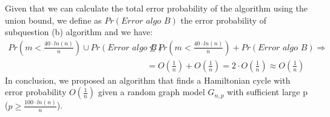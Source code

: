 \documentclass[11pt]{537homework}
\begin{document}
Given that we can calculate the total error probability of the algorithm using the union bound, we define as $Pr(\textit{Error algo B})$ the error probability of subquestion (b) algorithm and we have:
\begin{align*}
Pr(m  < \frac{40 \cdot ln(n)}{n}) \cup Pr(\textit{Error algo B})  &\leq  Pr(m  < \frac{40 \cdot ln(n)}{n}) + Pr(\textit{Error algo B}) \Longrightarrow \\ 
&= O(\frac{1}{n}) + O(\frac{1}{n}) = 2 \cdot O(\frac{1}{n}) \approx O(\frac{1}{n})
\end{align*}
In conclusion, we proposed an algorithm that finds a Hamiltonian cycle with error probability $O(\frac{1}{n})$ given a random graph model $G_{n,p}$ with sufficient large p ($p \geq \frac{100 \cdot ln(n)}{n}$).
\end{document}
